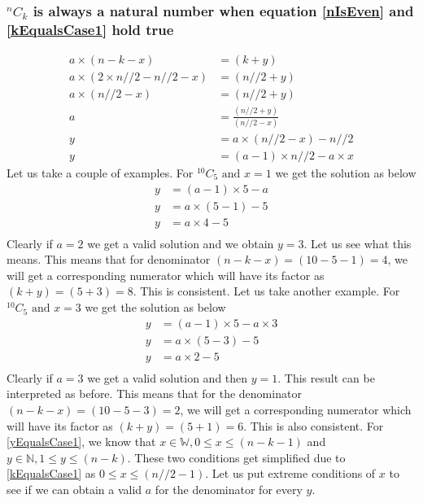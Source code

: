 \documentclass[12pt, twoside]{article}
\newcommand*{\Combination}[2]{{}^{#1}C_{#2}}%
\begin{document}
\subsubsection{$\Combination{n}{k}$ is always a natural number when equation \eqref{nIsEven} and \eqref{kEqualsCase1} hold true}\label{ProofkEqualsCase1}
\begin{align}
	a \times (n-k-x) &= (k+y) \nonumber \\
	a \times (2\times n//2 - n//2 -x) &= (n//2+y) \nonumber \\
	a \times(n//2 -x) &= (n//2 + y) \nonumber \\
	a &= \frac{(n//2+y)}{(n//2-x)} \nonumber\\
	y &= a\times(n//2-x) - n//2 \nonumber \\
	y &= (a-1)\times n//2 - a\times x \label{yEqualsCase1}
\end{align}
Let us take a couple of examples. \newline
For $\Combination{10}{5} \text{ and } x = 1$ we get the solution as below
\begin{align*}
	y &= (a-1)\times 5 - a \\
	y &= a \times (5 - 1) - 5 \\
	y &= a \times 4 - 5 \\
\end{align*}
Clearly if $a = 2$ we get a valid solution and we obtain $y=3$. Let us see what this means. This means that for denominator $(n-k-x) = (10-5-1) = 4$, we will get a corresponding numerator which will have its factor as $(k+y) = (5+3) = 8$. This is consistent. Let us take another example.\newline
For $\Combination{10}{5} \text{ and } x = 3$ we get the solution as below
\begin{align*}
	y &= (a-1)\times 5 - a \times 3 \\
	y &= a \times (5 - 3) - 5 \\
	y &= a \times 2 - 5 \\
\end{align*}
Clearly if $a = 3$ we get a valid solution and then $y=1$. This result can be interpreted as before. This means that for the denominator $(n-k-x) = (10-5-3) = 2$, we will get a corresponding numerator which will have its factor as $(k+y) = (5+1) = 6$. This is also consistent.\newline
For \eqref{yEqualsCase1}, we know that $x \in \mathbb{W}, 0 \leq x \leq (n-k-1)$ and $y \in \mathbb{N}, 1 \leq y \leq (n-k)$. These two conditions get simplified due to \eqref{kEqualsCase1} as $0 \leq x \leq (n//2-1)$. Let us put extreme conditions of $x$ to see if we can obtain a valid \textbf{$a$} for the denominator for every $y$.
\end{document}
